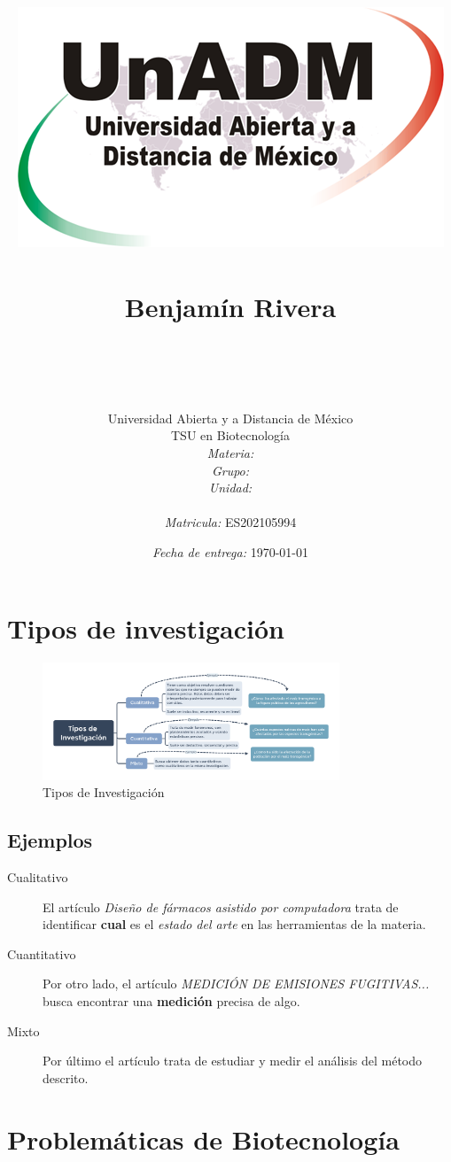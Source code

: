 \documentclass[12pt]{article}
\title{
	\includegraphics{../../../assets/logo-unadm} \\
	\ \\ Benjam\'in Rivera \\
	\bf{\titulo}\\\ \\}
\author{
	Universidad Abierta y a Distancia de México \\
	TSU en Biotecnolog\'ia \\
	\textit{Materia:} \materia \\
	\textit{Grupo:} \grupo \\
	\textit{Unidad:} \unidad \\
	\\
	\textit{Matricula:} ES202105994 }
\date{\textit{Fecha de entrega:} \today}
\begin{document}
\maketitle\newpage

\section{Tipos de investigaci\'on \cite{tipos}}

	\begin{figure}[h]
		\centering
			\includegraphics[width=0.79\textwidth, angle=90]{Tipos-Investigacion.png}
		\caption{Tipos de Investigación}
		\label{fig: investigacion}
	\end{figure}


\subsection{Ejemplos}

	\begin{description}
		\item[Cualitativo] El art\'iculo \textit{Diseño de fármacos asistido por computadora}\cite{cadFarmacos} trata de identificar \textbf{cual} es el \textit{estado del arte} en las herramientas de la materia. 
		\item[Cuantitativo] Por otro lado, el art\'iculo \textit{MEDICIÓN DE EMISIONES FUGITIVAS...}\cite{cuantitativos} busca encontrar una \textbf{medici\'on} precisa de algo.
		\item[Mixto] Por \'ultimo el art\'iculo \cite{mixto} trata de estudiar y medir el an\'alisis del m\'etodo descrito.
	\end{description}


\section{Problem\'aticas de Biotecnolog\'ia}
\end{document}
